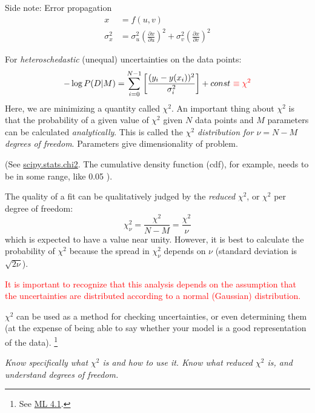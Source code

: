 \documentclass{article}
\newcommand{\test}[1]{%
    \begin{center}
        \colorbox{hl}{\parbox{0.9\textwidth}{\emph{\centering #1}}}
    \end{center}}
\newcommand{\mynotes}[1]{%
    \fontfamily{phv}\selectfont\textcolor{myGreen}{#1}
    }
\begin{document}
\begin{framed}
Side note: Error propagation
\begin{align*}
    x &= f(u,v)\\
    \sigma_{x}^{2} &=
    \sigma_{u}^{2}\left(\frac{\partial{x}}{\partial{u}}\right)^{2} +
    \sigma_{v}^{2}\left(\frac{\partial{x}}{\partial{v}}\right)^{2}
\end{align*}
\end{framed}

For \textit{heteroschedastic} (unequal) uncertainties on the data points:
\[
    -\log P(D|M) = \sum_{i=0}^{N-1}{
        \left[ \frac{(y_{i}-y(x_{i}))^{2}}{\sigma_{i}^{2}} \right] }
    + const\ \textcolor{red}{\equiv \chi^{2}}
    \]
Here, we are minimizing a quantity called
$\chi^{2}$. An important thing about $\chi^{2}$ is that the probability
of a given value of $\chi^{2}$ given $N$ data points and $M$ parameters
can be calculated \textit{analytically}. This is called the
\textit{$\chi^{2}$ distribution for $\nu = N-M$ degrees of freedom}.
\mynotes{Parameters give dimensionality of problem.}
(See
\href{http://docs.scipy.org/doc/scipy-0.15.1/reference/generated/scipy.stats.chi2.html}
{scipy.stats.chi2}. The cumulative density function (cdf), for example,
needs to be in some range, like 0.05 ).

The quality of a fit can be qualitatively judged by the
\textit{reduced} $\chi^{2}$, or $\chi^{2}$ per degree of freedom:
\[
    \chi_{\nu}^{2} = \frac{\chi^{2}}{N-M} = \frac{\chi^{2}}{\nu}
    \]
which is expected to have a value near unity. However, it is best to calculate
the probability of $\chi^{2}$ because the spread in $\chi_{\nu}^{2}$ depends
on $\nu$ (standard deviation is $\sqrt{2\nu}$).

\textcolor{red}{It is important to recognize that this analysis depends
on the assumption that the uncertainties are distributed according to
a normal (Gaussian) distribution.}

$\chi^{2}$ can be used as a method for checking uncertainties, or even
determining them (at the expense of being able to say whether your
model is a good representation of the data).
\footnote{
    See \href{http://astronomy.nmsu.edu/holtz/a575/images/ML4.1.png}{ML 4.1}.
}

\test{Know specifically what $\chi^{2}$ is and how to use it.  Know what reduced
$\chi^{2}$ is, and understand degrees of freedom.}
\end{document}
